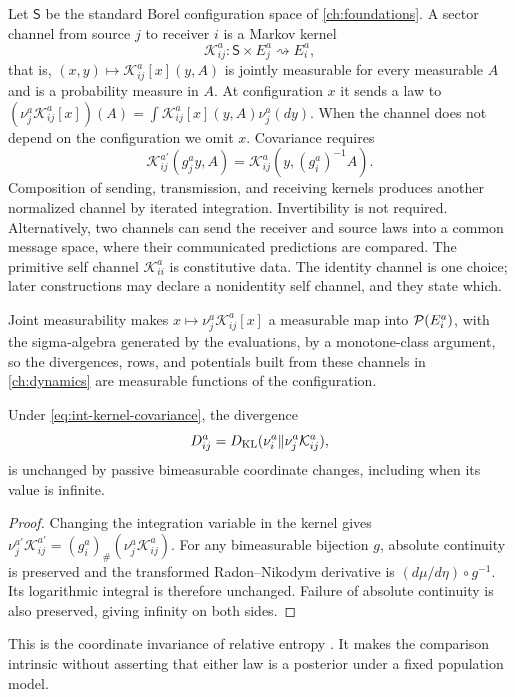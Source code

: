 Let $\mathsf S$ be the standard Borel configuration space of \cref{ch:foundations}. A sector channel from source $j$ to receiver $i$ is a Markov kernel
\begin{equation}
\mathcal K_{ij}^a:\mathsf S\times E_j^a\rightsquigarrow E_i^a,
\end{equation}
that is, $(x,y)\mapsto\mathcal K_{ij}^a[x](y,A)$ is jointly measurable for every measurable $A$ and is a probability measure in $A$. At configuration $x$ it sends a law to $(\nu_j^a\mathcal K_{ij}^a[x])(A)=\int\mathcal K_{ij}^a[x](y,A)\nu_j^a(dy)$. When the channel does not depend on the configuration we omit $x$. Covariance requires
\begin{equation}
\mathcal K_{ij}^{a\prime}(g_j^a y,A)
=\mathcal K_{ij}^a(y,(g_i^a)^{-1}A).
\label{eq:int-kernel-covariance}
\end{equation}
Composition of sending, transmission, and receiving kernels produces another normalized channel by iterated integration. Invertibility is not required. Alternatively, two channels can send the receiver and source laws into a common message space, where their communicated predictions are compared. The primitive self channel $\mathcal K_{ii}^a$ is constitutive data. The identity channel is one choice; later constructions may declare a nonidentity self channel, and they state which.

Joint measurability makes $x\mapsto\nu_j^a\mathcal K_{ij}^a[x]$ a measurable map into $\mathcal P(E_i^a)$, with the sigma-algebra generated by the evaluations, by a monotone-class argument, so the divergences, rows, and potentials built from these channels in \cref{ch:dynamics} are measurable functions of the configuration.

Under \cref{eq:int-kernel-covariance}, the divergence
\begin{equation}
D_{ij}^a=D_{\mathrm{KL}}(\nu_i^a\Vert\nu_j^a\mathcal K_{ij}^a),
\label{eq:int-peer-divergence}
\end{equation}
is unchanged by passive bimeasurable coordinate changes, including when its value is infinite.
\begin{proof}
Changing the integration variable in the kernel gives
$\nu_j^{a\prime}\mathcal K_{ij}^{a\prime}=(g_i^a)_\#(\nu_j^a\mathcal K_{ij}^a)$.
For any bimeasurable bijection $g$, absolute continuity is preserved and the transformed Radon--Nikodym derivative is $(d\mu/d\eta)\circ g^{-1}$. Its logarithmic integral is therefore unchanged. Failure of absolute continuity is also preserved, giving infinity on both sides.
\end{proof}
This is the coordinate invariance of relative entropy \citep{KullbackLeibler1951}. It makes the comparison intrinsic without asserting that either law is a posterior under a fixed population model.

